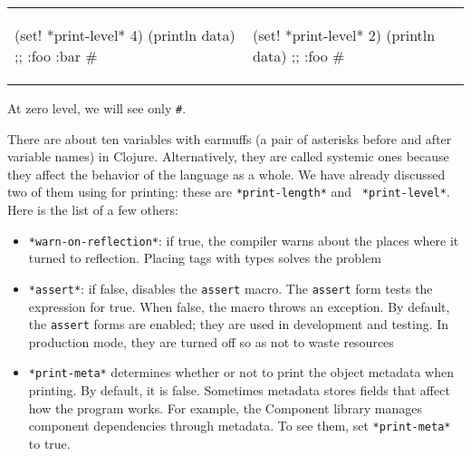 \else

\begin{english}
\noindent
\begin{tabular}{ @{}p{5cm} @{}p{5cm} }


  \begin{clojure}
(set! *print-level* 4)
(println data)
;; {:foo {:bar #}}
  \end{clojure}

&

  \begin{clojure}
(set! *print-level* 2)
(println data)
;; {:foo #}
  \end{clojure}

\end{tabular}

\end{english}

\fi

\noindent
At zero level, we will see only \verb|#|.

There are about ten variables with earmuffs (a pair of asterisks before and after variable names) in Clojure. Alternatively, they are called systemic ones because they affect the behavior of the language as a whole. We have already discussed two of them using for printing: these are \verb|*print-length*| and ~\verb|*print-level*|.
Here is the list of a few others:


\begin{itemize}


\item
  \verb|*warn-on-reflection*|: if true, the compiler warns about the places where it turned to reflection. Placing tags with types solves the problem


\item
  \verb|*assert*|: if false, disables the \verb|assert| macro. The \verb|assert| form tests the expression for true. When false, the macro throws an exception. By default, the \verb|assert| forms are enabled; they are used in development and testing. In production mode, they are turned off so as not to waste resources

\label{print-meta}


\item
  \verb|*print-meta*| determines whether or not to print the object metadata when printing. 
By default, it is false. Sometimes metadata stores fields that affect how the program works.
For example, the Component library manages component dependencies through metadata.
To see them, set \verb|*print-meta*| to true.

\end{itemize}

